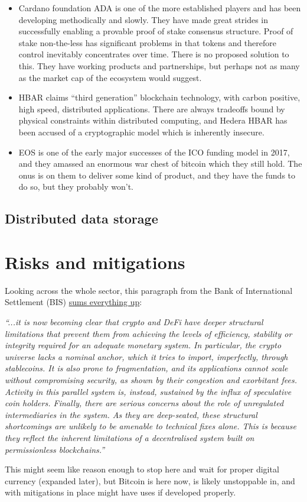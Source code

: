 \begin{itemize}
\item Cardano foundation ADA is one of the more established players and has been developing methodically and slowly. They have made great strides in successfully enabling a provable proof of stake consensus structure. Proof of stake non-the-less has significant problems in that tokens and therefore control inevitably concentrates over time. There is no proposed solution to this. They have working products and partnerships, but perhaps not as many as the market cap of the ecosystem would suggest. 
\item HBAR claims ``third generation'' blockchain technology, with carbon positive, high speed, distributed applications. There are always tradeoffs bound by physical constraints within distributed computing, and Hedera HBAR has been accused of a cryptographic model which is inherently insecure.
\item EOS is one of the early major successes of the ICO funding model in 2017, and they amassed an enormous war chest of bitcoin which they still hold. The onus is on them to deliver some kind of product, and they have the funds to do so, but they probably won't.
\end{itemize}
\subsection{Distributed data storage}
\lipsum
\section{Risks and mitigations}
Looking across the whole sector, this paragraph from the Bank of International Settlement (BIS) \href{https://www.bis.org/publ/arpdf/ar2022e3.htm}{sums everything up}: \par
\textit{``...it is now becoming clear that crypto and DeFi have deeper structural limitations that prevent them from achieving the levels of efficiency, stability or integrity required for an adequate monetary system. In particular, the crypto universe lacks a nominal anchor, which it tries to import, imperfectly, through stablecoins. It is also prone to fragmentation, and its applications cannot scale without compromising security, as shown by their congestion and exorbitant fees. Activity in this parallel system is, instead, sustained by the influx of speculative coin holders. Finally, there are serious concerns about the role of unregulated intermediaries in the system. As they are deep-seated, these structural shortcomings are unlikely to be amenable to technical fixes alone. This is because they reflect the inherent limitations of a decentralised system built on permissionless blockchains.''}\par
This might seem like reason enough to  stop here and wait for proper digital currency (expanded later), but Bitcoin is here now, is likely unstoppable in, and with mitigations in place might have uses if developed properly.
